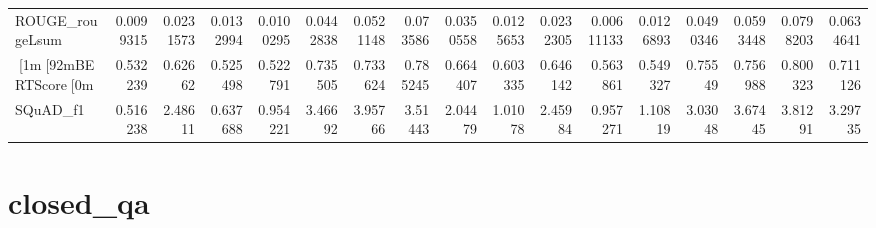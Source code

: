 \begin{tabular}{lrrrrrrrrrrrrrrrr}
 ROUGE_rougeLsum & 0.0099315   & 0.0231573   & 0.0132994   & 0.0100295   & 0.0442838  &  0.0521148 &  0.073586  &  0.0350558 & 0.0125653  & 0.0232305   & 0.00611133  & 0.0126893   & 0.0490346 &  0.0593448 &  0.0798203 &  0.0634641 \\
 [1m[92mBERTScore[0m       & 0.532239    & 0.62662     & 0.525498    & 0.522791    & 0.735505   &  0.733624  &  0.785245  &  0.664407  & 0.603335   & 0.646142    & 0.563861    & 0.549327    & 0.75549   &  0.756988  &  0.800323  &  0.711126  \\
 SQuAD_f1        & 0.516238    & 2.48611     & 0.637688    & 0.954221    & 3.46692    &  3.95766   &  3.51443   &  2.04479   & 1.01078    & 2.45984     & 0.957271    & 1.10819     & 3.03048   &  3.67445   &  3.81291   &  3.29735   \\
\hline
\end{tabular}\section{closed_qa}
